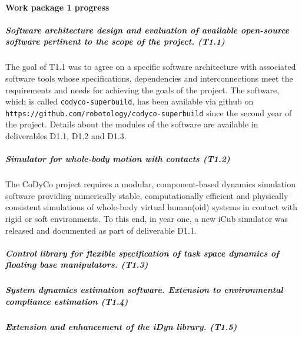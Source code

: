 

\paragraph{Work package 1 progress}

\subparagraph{Software architecture design and evaluation of available
  open-source software pertinent to the scope of the project. (T1.1)}

The goal of T1.1 was to agree on a specific software architecture with
associated software tools whose specifications, dependencies and
interconnections meet the requirements and needs for achieving the goals of
the project.  The software, which is called \texttt{codyco-superbuild}, has
been available via github on
\texttt{https://github.com/robotology/codyco-superbuild} since the second year
of the project.  Details about the modules of the software are available in
deliverables D1.1, D1.2 and D1.3.

\subparagraph{Simulator for whole-body motion with contacts (T1.2)}

The CoDyCo project requires a modular, component-based dynamics simulation
software providing numerically stable, computationally efficient and
physically consistent simulations of whole-body virtual human(oid) systems in
contact with rigid or soft environments.  To this end, in year one, a new iCub
simulator was released and documented as part of deliverable D1.1.


\subparagraph{Control library for flexible specification of task space
  dynamics of floating base manipulators. (T1.3)}



\subparagraph{System dynamics estimation software. Extension to
environmental compliance estimation (T1.4)}

  
\subparagraph{Extension and enhancement of the iDyn library. (T1.5)}
\label{sec:T15}












